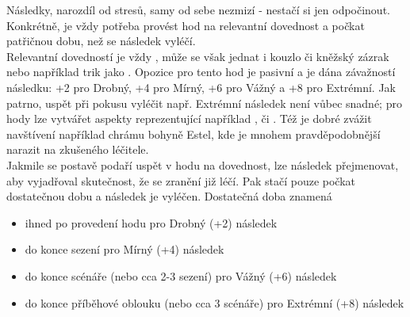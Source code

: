 \documentclass[../main.tex]{subfiles}
\begin{document}
Následky, narozdíl od stresů, samy od sebe nezmizí - nestačí si jen odpočinout. Konkrétně, je vždy potřeba provést hod na relevantní dovednost a počkat patřičnou dobu, než se následek vyléčí.\\
Relevantní dovedností je vždy , může se však jednat i kouzlo či kněžský zázrak nebo například trik jako . Opozice pro tento hod je pasivní a je dána závažností následku: +2 pro Drobný, +4 pro Mírný, +6 pro Vážný a +8 pro Extrémní. Jak patrno, uspět při pokusu vyléčit např. Extrémní následek není vůbec snadné; pro hody lze vytvářet aspekty reprezentující například ,  či . Též je dobré zvážit navštívení například chrámu bohyně Estel, kde je mnohem pravděpodobnější narazit na zkušeného léčitele.\\
Jakmile se postavě podaří uspět v hodu na dovednost, lze následek přejmenovat, aby vyjadřoval skutečnost, že se zranění již léčí. Pak stačí pouze počkat dostatečnou dobu a následek je vyléčen. Dostatečná doba znamená

\begin{itemize}
\item ihned po provedení hodu pro Drobný (+2) následek
\item do konce sezení pro Mírný (+4) následek
\item do konce scénáře (nebo cca 2-3 sezení) pro Vážný (+6) následek
\item do konce příběhové oblouku (nebo cca 3 scénáře) pro Extrémní (+8) následek
\end{itemize}
\end{document}

